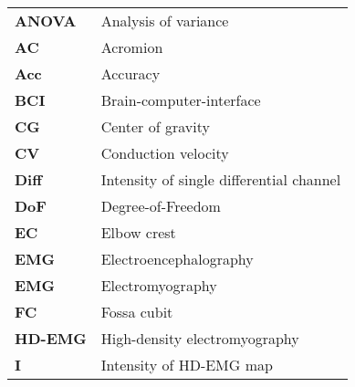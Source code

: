 \newpage
{}
{}

\begin{acronyms}
\\
\\
\begin{table}[!h]
\normalsize
\begin{tabular}{ll}
\textbf{ANOVA}           & Analysis of variance                                                                        \\
\textbf{AC}             & Acromion                                                                      \\
\textbf{Acc}             & Accuracy                                                                        \\
\textbf{BCI}             & Brain-computer-interface                                                                        \\
\textbf{CG}              & Center of gravity                                                                       \\
\textbf{CV}              & Conduction velocity                                                                       \\
\textbf{Diff}             & Intensity of single differential channel                                                                        \\
\textbf{DoF}             & Degree-of-Freedom                                                                        \\
\textbf{EC}              & Elbow crest                                                                       \\
\textbf{EMG}             & Electroencephalography                                                                        \\
\textbf{EMG}             & Electromyography                                                                        \\
\textbf{FC}              & Fossa cubit                                                                       \\
\textbf{HD-EMG}         & High-density electromyography                                                                    \\
\textbf{I}                 & Intensity of HD-EMG map                                                                                 \\

\end{tabular}
\end{table}
\end{acronyms}
